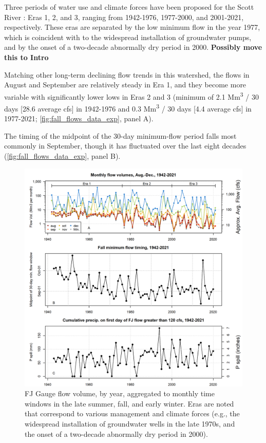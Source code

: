 \documentclass[hess, manuscript]{copernicus}
\begin{document}
Three periods of water use and climate forces have been proposed for the
Scott River \citep[e.g., by][]{Pyschik2022}: Eras 1, 2, and 3, ranging
from 1942-1976, 1977-2000, and 2001-2021, respectively. These eras are
separated by the low minimum flow in the year 1977, which is coincident
with to the widespread installation of groundwater pumps, and by the
onset of a two-decade abnormally dry period in 2000. \textbf{Possibly
move this to Intro}

Matching other long-term declining flow trends in this watershed, the
flows in August and September are relatively steady in Era 1, and they
become more variable with significantly lower lows in Eras 2 and 3
(minimum of 2.1 Mm\textsuperscript{3} / 30 days {[}28.6 average cfs{]}
in 1942-1976 and 0.3 Mm\textsuperscript{3} / 30 days {[}4.4 average
cfs{]} in 1977-2021; \autoref{fig:fall_flows_data_exp}, panel A).

The timing of the midpoint of the 30-day minimum-flow period falls most
commonly in September, though it has fluctuated over the last eight
decades (\autoref{fig:fall_flows_data_exp}, panel B).

\begin{figure}
\includegraphics[width=1\linewidth]{f06} \caption{\label{fig:fall_flows_data_exp} FJ Gauge flow volume, by year, aggregated to monthly time windows in the late summer, fall, and early winter. Eras are noted that correspond to various management and climate forces (e.g., the widespread installation of groundwater wells in the late 1970s, and the onset of a two-decade abnormally dry period in 2000). }\label{fig:fall_flows_data_exp}
\end{figure}
\end{document}
